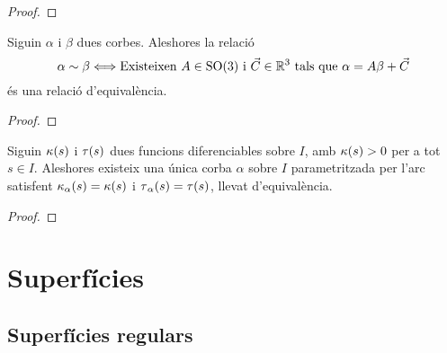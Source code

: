 \documentclass[../Apunts.tex]{subfiles}
\begin{document}
	\begin{proof}
	\end{proof}
	\begin{lemma}
		\label{lemma:Teorema Fonamental de la teoria local de corbes}
		Siguin \(\alpha\) i \(\beta\) dues corbes. Aleshores la relació
		\[\alpha\sim\beta \Longleftrightarrow \text{Existeixen }A\in\mathrm{SO}(3)\text{ i }\vec{C}\in\mathbb{R}^{3}\text{ tals que }\alpha=A\beta+\vec{C}\]
		és una relació d'equivalència.
	\end{lemma}
	\begin{proof}
	\end{proof}
	\begin{theorem}
		\label{thm:Teorema Fonamental de la teoria local del corbes}
		Siguin \(\operatorname{\kappa}(s)\) i \(\operatorname{\tau}(s)\) dues funcions diferenciables sobre \(I\), amb \(\operatorname{\kappa}(s)>0\) per a tot \(s\in I\). Aleshores existeix una única corba \(\alpha\) sobre \(I\) parametritzada per l'arc satisfent \(\operatorname{\kappa}_{\alpha}(s)=\operatorname{\kappa}(s)\) i \(\operatorname{\tau}_{\alpha}(s)=\operatorname{\tau}(s)\), llevat d'equivalència. %
	\end{theorem}
	\begin{proof}
	\end{proof}
\chapter{Superfícies}
\section{Superfícies regulars}
\end{document}

